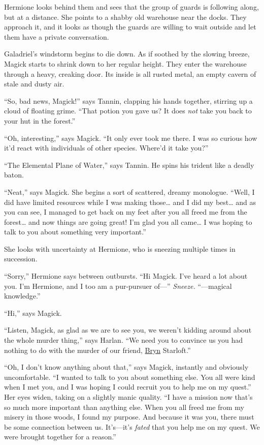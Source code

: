\documentclass[smalldemyvopaper,11pt,twoside,onecolumn,openright,extrafontsizes]{memoir}
\begin{document}
Hermione looks behind them and sees that the group of guards is
following along, but at a distance. She points to a shabby old warehouse
near the docks. They approach it, and it looks as though the guards are
willing to wait outside and let them have a private conversation.

Galadriel's windstorm begins to die down. As if soothed by the slowing
breeze, Magick starts to shrink down to her regular height. They enter
the warehouse through a heavy, creaking door. Its inside is all rusted
metal, an empty cavern of stale and dusty air.

``So, bad news, Magick!'' says Tannin, clapping his hands together,
stirring up a cloud of floating grime. ``That potion you gave us? It
does \emph{not} take you back to your hut in the forest.''

``Oh, interesting,'' says Magick. ``It only ever took me there. I was so
curious how it'd react with individuals of other species. Where'd it
take you?''

``The Elemental Plane of Water,'' says Tannin. He spins his trident like
a deadly baton.

``Neat,'' says Magick. She begins a sort of scattered, dreamy monologue.
``Well, I did have limited resources while I was making those\ldots{}
and I did my best\ldots{} and as you can see, I managed to get back on
my feet after you all freed me from the forest\ldots{} and now things
are going great! I'm glad you all came\ldots{} I was hoping to talk to
you about something very important.''

She looks with uncertainty at Hermione, who is sneezing multiple times
in succession.

``Sorry,'' Hermione says between outbursts. ``Hi Magick. I've heard a
lot about you. I'm Hermione, and I too am a pur-pursuer of---''
\emph{Sneeze.} ``---magical knowledge.''

``Hi,'' says Magick.

``Listen, Magick, as glad as we are to see you, we weren't kidding
around about the whole murder thing,'' says Harlan. ``We need you to
convince us you had nothing to do with the murder of our friend,
\href{/characters/bryn/}{Bryn} Starloft.''

``Oh, I don't know anything about that,'' says Magick, instantly and
obviously uncomfortable. ``I wanted to talk to you about something else.
You all were kind when I met you, and I was hoping I could recruit you
to help me on my quest.'' Her eyes widen, taking on a slightly manic
quality. ``I have a mission now that's so much more important than
anything else. When you all freed me from my misery in those woods, I
found my purpose. And because it was you, there must be some connection
between us. It's---it's \emph{fated} that you help me on my quest. We
were brought together for a reason.''
\end{document}
